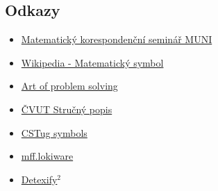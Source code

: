 \documentclass{article}
\begin{document}
\begin{multicols}{2}
		\section{Odkazy}
		\begin{itemize}
			\item \href{http://mks.mff.cuni.cz/info/tex/psani.php}{Matematický korespondenční seminář MUNI}
			\item \href{http://cs.wikipedia.org/wiki/Matematický_symbol}{Wikipedia - Matematický symbol}
			\item \href{http://www.artofproblemsolving.com/Wiki/index.php/LaTeX:Symbols}{Art of problem solving}
			\item \href{http://mat.fsv.cvut.cz/konickova/navody/ltxstruc.pdf}{ČVUT Stručný popis}
			\item \href{http://ftp.cstug.cz/pub/tex/CTAN/info/symbols/comprehensive/symbols-letter.pdf}{CSTug symbols}
			\item \href{http://mff.lokiware.info/LaTeX}{mff.lokiware}
			\item \href{http://detexify.kirelabs.org/classify.html}{Detexify$^2$}
		\end{itemize}
	\end{multicols}
\end{document}
